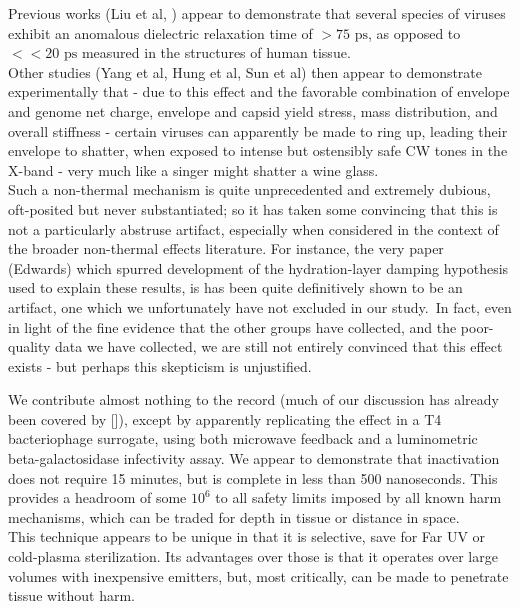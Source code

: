 \documentclass[paper.tex]{subfiles}
\begin{document}
\begin{multicols}{1}
Previous works (Liu et al, ) appear to demonstrate that several species of viruses exhibit an anomalous dielectric relaxation time of $> 75 \text{ ps}$, as opposed to $<< 20 \text{ ps}$ \footnotemark measured in the structures of human tissue.\\

Other studies (Yang et al, Hung et al, Sun et al) then appear to demonstrate experimentally that - due to this effect and the favorable combination of envelope and genome net charge, envelope and capsid yield stress, mass distribution, and overall stiffness - certain viruses can  apparently be made to ring up, leading their envelope to shatter, when exposed to intense but ostensibly safe CW tones in the X-band - very much like a singer might shatter a wine glass.\\

Such a non-thermal mechanism is quite unprecedented and extremely dubious, oft-posited but never substantiated; so it has taken some convincing that this is not a particularly abstruse artifact, especially when considered in the context of the broader non-thermal effects literature. For instance, the very paper (Edwards) which spurred development of the hydration-layer damping hypothesis used to explain these results, is has been quite\cite{Resonances1987} definitively\cite{Microwave1993a} shown to be an artifact, one which we unfortunately have not excluded in our study.\footnotemark \ In fact, even in light of the fine evidence that the other groups have collected, and the poor-quality data we have collected, we are still not entirely convinced that this effect exists - but perhaps this skepticism is unjustified.\\


We contribute almost nothing to the record (much of our discussion has already been covered by []), except by apparently replicating the effect in a T4 bacteriophage surrogate, using both microwave feedback and a luminometric beta-galactosidase infectivity assay. We appear to demonstrate that inactivation does not require 15 minutes, but is complete in less than 500 nanoseconds. This provides a headroom of some $10^6$ to all safety limits imposed by all known harm mechanisms, which can be traded for depth in tissue or distance in space. \\

This technique appears to be unique in that it is selective, save for Far UV or cold-plasma sterilization. Its advantages over those is that it operates over large volumes with inexpensive emitters, but, most critically, can be made to penetrate tissue without harm.


\end{multicols}
\end{document}
